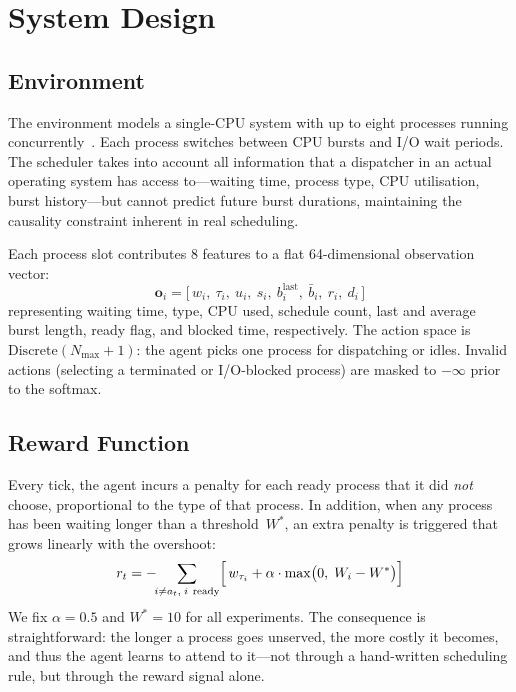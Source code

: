 \documentclass[conference]{IEEEtran}
\newcommand{\blast}{b^{\text{last}}}
\begin{document}
\section{System Design}

\subsection{Environment}

The environment models a single-CPU system with up to eight processes
running concurrently~\cite{towers2023gymnasium}. Each process switches
between CPU bursts and I/O wait periods. The scheduler takes into account
all information that a dispatcher in an actual operating system has access
to---waiting time, process type, CPU utilisation, burst history---but cannot
predict future burst durations, maintaining the causality constraint
inherent in real scheduling.

Each process slot contributes 8 features to a flat 64-dimensional
observation vector:
\[
\mathbf{o}_i = \bigl[\, w_i,\ \tau_i,\ u_i,\ s_i,\ \blast_i,\ \bar{b}_i,\ r_i,\ d_i \,\bigr]
\]
representing waiting time, type, CPU used, schedule count, last and average
burst length, ready flag, and blocked time, respectively. The action space is
$\mathrm{Discrete}(N_{\max}{+}1)$: the agent picks one process for
dispatching or idles. Invalid actions (selecting a terminated or I/O-blocked
process) are masked to $-\infty$ prior to the softmax.

\subsection{Reward Function}

Every tick, the agent incurs a penalty for each ready process that it did
\emph{not} choose, proportional to the type of that process. In addition,
when any process has been waiting longer than a threshold~$W^{*}$, an extra
penalty is triggered that grows linearly with the overshoot:
\begin{equation}
r_t = -\!\!\sum_{i \neq a_t,\; i\ \text{ready}}
\Bigl[\, w_{\tau_i} + \alpha \cdot \max\bigl(0,\; W_i - W^{*}\bigr) \Bigr]
\label{eq:reward}
\end{equation}
We fix $\alpha = 0.5$ and $W^{*} = 10$ for all experiments. The consequence
is straightforward: the longer a process goes unserved, the more costly it
becomes, and thus the agent learns to attend to it---not through a
hand-written scheduling rule, but through the reward signal alone.
\end{document}

